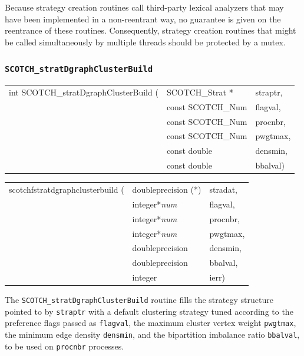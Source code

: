 Because strategy creation routines call third-party lexical analyzers
that may have been implemented in a non-reentrant way, no guarantee is
given on the reentrance of these routines. Consequently, strategy
creation routines that might be called simultaneously by multiple
threads should be protected by a mutex.

\subsubsection{{\tt SCOTCH\_stratDgraphClusterBuild}}
\label{sec-lib-func-stratdgraphclusterbuild}

\begin{itemize}
\progsyn

{\tt\begin{tabular}{l@{}ll}
int SCOTCH\_stratDgraphClusterBuild ( & SCOTCH\_Strat *   & straptr, \\
                                      & const SCOTCH\_Num & flagval, \\
                                      & const SCOTCH\_Num & procnbr, \\
                                      & const SCOTCH\_Num & pwgtmax, \\
                                      & const double      & densmin, \\
                                      & const double      & bbalval)
\end{tabular}}

{\tt\begin{tabular}{l@{}ll}
scotchfstratdgraphclusterbuild ( & doubleprecision (*) & stradat, \\
                                 & integer*{\it num}   & flagval, \\
                                 & integer*{\it num}   & procnbr, \\
                                 & integer*{\it num}   & pwgtmax, \\
                                 & doubleprecision     & densmin, \\
                                 & doubleprecision     & bbalval, \\
                                 & integer             & ierr)
\end{tabular}}

\progdes

The {\tt SCOTCH\_stratDgraphClusterBuild} routine fills the strategy
structure pointed to by {\tt straptr} with a default clustering
strategy tuned according to the preference flags passed as
{\tt flagval}, the maximum cluster vertex weight {\tt pwgtmax},
the minimum edge density {\tt densmin}, and the bipartition imbalance
ratio {\tt bbalval}, to be used on {\tt procnbr} processes.


\end{itemize}
